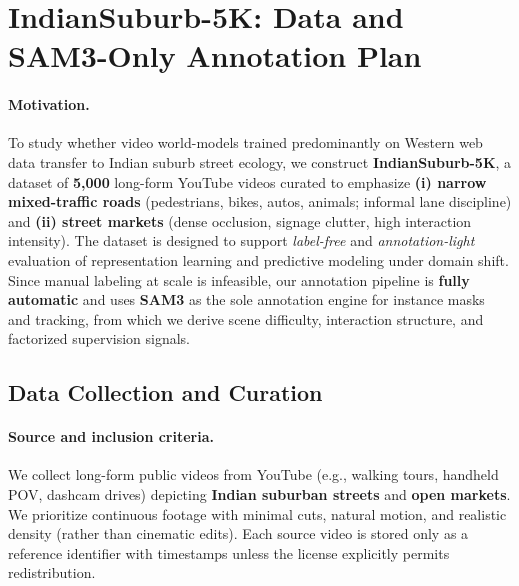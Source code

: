 

\section{IndianSuburb-5K: Data and SAM3-Only Annotation Plan}
\label{sec:indiasuburb5k_data}

\paragraph{Motivation.}
To study whether video world-models trained predominantly on Western web data transfer to Indian suburb street ecology, we construct \textbf{IndianSuburb-5K}, a dataset of \textbf{5,000} long-form YouTube videos curated to emphasize \textbf{(i) narrow mixed-traffic roads} (pedestrians, bikes, autos, animals; informal lane discipline) and \textbf{(ii) street markets} (dense occlusion, signage clutter, high interaction intensity). The dataset is designed to support \emph{label-free} and \emph{annotation-light} evaluation of representation learning and predictive modeling under domain shift. Since manual labeling at scale is infeasible, our annotation pipeline is \textbf{fully automatic} and uses \textbf{SAM3} as the sole annotation engine for instance masks and tracking, from which we derive scene difficulty, interaction structure, and factorized supervision signals.

\subsection{Data Collection and Curation}
\label{sec:indiasuburb5k_collection}

\paragraph{Source and inclusion criteria.}
We collect long-form public videos from YouTube (e.g., walking tours, handheld POV, dashcam drives) depicting \textbf{Indian suburban streets} and \textbf{open markets}. We prioritize continuous footage with minimal cuts, natural motion, and realistic density (rather than cinematic edits). Each source video is stored only as a reference identifier with timestamps unless the license explicitly permits redistribution.

